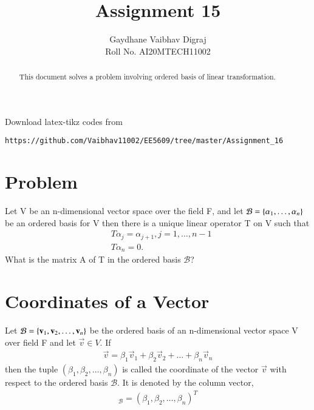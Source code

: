 \documentclass[journal,12pt,twocolumn]{IEEEtran}
\begin{document}
     \def\rightbox#1{\makebox[0in][r]{#1}}
     \def\centbox#1{\makebox[0in]{#1}}
     \def\topbox#1{\raisebox{-\baselineskip}[0in][0in]{#1}}
     \def\midbox#1{\raisebox{-0.5\baselineskip}[0in][0in]{#1}}
\vspace{3cm}
\title{Assignment 15}
\author{Gaydhane Vaibhav Digraj \\ Roll No. AI20MTECH11002}
\maketitle
\newpage
\bigskip
\renewcommand{\thefigure}{\theenumi}
\renewcommand{\thetable}{\theenumi}
\begin{abstract}
This document solves a problem involving ordered basis of linear transformation.
\end{abstract}
%
Download latex-tikz codes from 
%
\begin{lstlisting}
https://github.com/Vaibhav11002/EE5609/tree/master/Assignment_16
\end{lstlisting}
%
\section{Problem}
Let V be an n-dimensional vector space over the field F, and let $\mathcal{B} = \left\{\alpha_1,\ldots, \alpha_n\right\}$ be an ordered basis for V then there is a unique linear operator T on V such that 
\begin{align*}
   &T\alpha_{j} = \alpha_{j+1},  j=1,\ldots,n-1 \\
   &T\alpha_n = 0. 
\end{align*}
What is the matrix A of T in the ordered basis $\mathcal{B}$?

\section{Coordinates of a Vector}
Let $\mathcal{B} = \left\{\mathbf{v}_1, \mathbf{v}_2,\ldots,\mathbf{v}_n\right\}$ be the ordered basis of an n-dimensional vector space V over field F and let $\vec{v}\in V$. If
\begin{align}
    \vec{v} = \beta_{1}\vec{v}_1 + \beta_{2}\vec{v}_2 + \ldots + \beta_{n}\vec{v}_n \label{v}
\end{align}
then the tuple $(\beta_{1},\beta_{2},\ldots,\beta_{n})$ is called the coordinate of the vector $\vec{v}$ with respect to the ordered basis $\mathcal{B}$. 
It is denoted by the column vector,
\begin{align}
    [\vec{v}]_\mathcal{B} = (\beta_{1},\beta_{2},\ldots,\beta_{n})^{T} \label{v_col}
\end{align}
\end{document}
